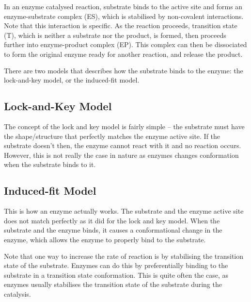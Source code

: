 \begin{center}
\end{center}

In an enzyme catalysed reaction, substrate binds to the active site and forms an enzyme-substrate complex (ES), which is stabilised by non-covalent interactions.
Note that this interaction is specific.
As the reaction proceeds, transition state (T), which is neither a substrate nor the product, is formed, then proceeds further into enzyme-product complex (EP).
This complex can then be dissociated to form the original enzyme ready for another reaction, and release the product.

There are two models that describes how the substrate binds to the enzyme: the lock-and-key model, or the induced-fit model.

\begin{center}
\end{center}

\subsection{Lock-and-Key Model}

The concept of the lock and key model is fairly simple -- the substrate must have the shape/structure that perfectly matches the enzyme active site.
If the substrate doesn't then, the enzyme cannot react with it and no reaction occurs.
However, this is not really the case in nature as enzymes changes conformation when the substrate binds to it.

\subsection{Induced-fit Model}

This is how an enzyme actually works.
The substrate and the enzyme active site does not match perfectly as it did for the lock and key model.
When the substrate and the enzyme binds, it causes a conformational change in the enzyme, which allows the enzyme to properly bind to the substrate.

Note that one way to increase the rate of reaction is by stabilising the transition state of the substrate.
Enzymes can do this by preferentially binding to the substrate in a transition state conformation.
This is quite often the case, as enzymes usually stabilises the transition state of the substrate during the catalysis.

